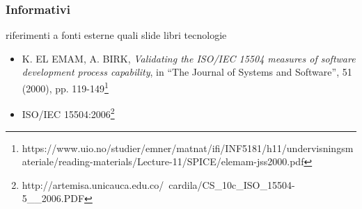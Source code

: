 \subsubsection{Informativi}
riferimenti a fonti esterne quali slide libri tecnologie
\begin{itemize}
	\item K. EL EMAM, A. BIRK, \textit{Validating the ISO/IEC 15504 measures of software development process capability}, in \enquote{The Journal of Systems and Software}, 51 (2000), pp. 119-149\footnote{https://www.uio.no/studier/emner/matnat/ifi/INF5181/h11/undervisningsmateriale/reading-materials/Lecture-11/SPICE/elemam-jss2000.pdf}
	\item ISO/IEC 15504:2006\footnote{http://artemisa.unicauca.edu.co/~cardila/CS\_10c\_ISO\_15504-5\_\_2006.PDF}
\end{itemize} 
